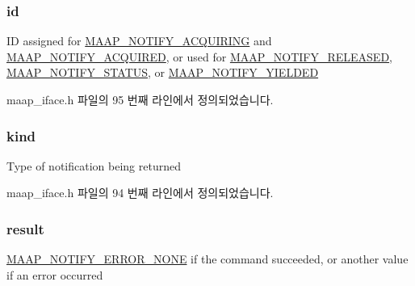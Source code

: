 \subsubsection[{\texorpdfstring{id}{id}}]{ id}\hypertarget{struct_maap___notify_a2708c0bbb6f926149707c2c61fe43c3e}{}\label{struct_maap___notify_a2708c0bbb6f926149707c2c61fe43c3e}
ID assigned for \hyperlink{maap__iface_8h_a0d45e125fb876b383321d96bc510285ea0f5d99d0f124fe7233cacefd53f26127}{M\+A\+A\+P\+\_\+\+N\+O\+T\+I\+F\+Y\+\_\+\+A\+C\+Q\+U\+I\+R\+I\+NG} and \hyperlink{maap__iface_8h_a0d45e125fb876b383321d96bc510285ea37a35b37b6f804ebc82248ae3ed110c6}{M\+A\+A\+P\+\_\+\+N\+O\+T\+I\+F\+Y\+\_\+\+A\+C\+Q\+U\+I\+R\+ED}, or used for \hyperlink{maap__iface_8h_a0d45e125fb876b383321d96bc510285eadcdf0612242dddc5976bc7eb80ae8813}{M\+A\+A\+P\+\_\+\+N\+O\+T\+I\+F\+Y\+\_\+\+R\+E\+L\+E\+A\+S\+ED}, \hyperlink{maap__iface_8h_a0d45e125fb876b383321d96bc510285ea993b057f5516f007248e70006319c846}{M\+A\+A\+P\+\_\+\+N\+O\+T\+I\+F\+Y\+\_\+\+S\+T\+A\+T\+US}, or \hyperlink{maap__iface_8h_a0d45e125fb876b383321d96bc510285ea438f0d11e6e3a74550cab4c378f9aeba}{M\+A\+A\+P\+\_\+\+N\+O\+T\+I\+F\+Y\+\_\+\+Y\+I\+E\+L\+D\+ED} 

maap\+\_\+iface.\+h 파일의 95 번째 라인에서 정의되었습니다.

\subsubsection[{\texorpdfstring{kind}{kind}}]{ kind}\hypertarget{struct_maap___notify_a28725ddb5295895b12a48456f73a5665}{}\label{struct_maap___notify_a28725ddb5295895b12a48456f73a5665}
Type of notification being returned 

maap\+\_\+iface.\+h 파일의 94 번째 라인에서 정의되었습니다.

\subsubsection[{\texorpdfstring{result}{result}}]{ result}\hypertarget{struct_maap___notify_a9d66bc8bbfd0a30a80edda69603ea9ba}{}\label{struct_maap___notify_a9d66bc8bbfd0a30a80edda69603ea9ba}
\hyperlink{maap__iface_8h_aad86c36b2cb1c22bfa5e2e5032f808ddaf7eb8886cefe2e917296e22c19bbebd0}{M\+A\+A\+P\+\_\+\+N\+O\+T\+I\+F\+Y\+\_\+\+E\+R\+R\+O\+R\+\_\+\+N\+O\+NE} if the command succeeded, or another value if an error occurred 

